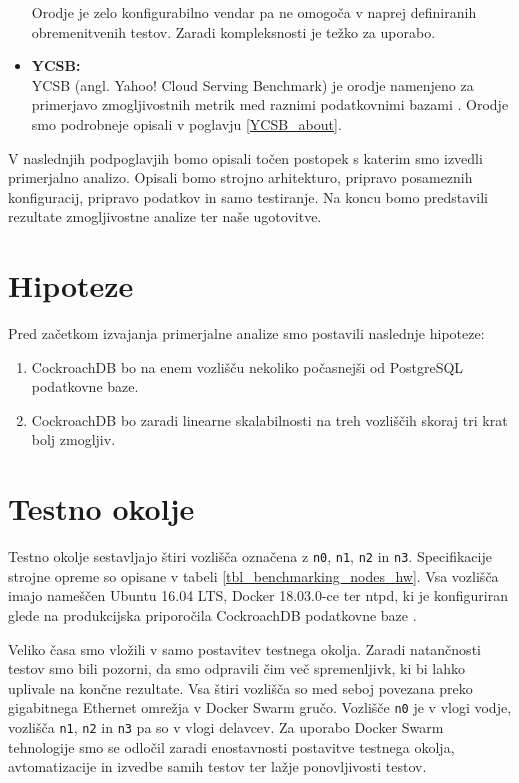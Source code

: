 \documentclass[a4paper, 12pt]{book}
\begin{document}
\begin{itemize}
    Orodje je zelo konfigurabilno vendar pa ne omogoča v naprej definiranih obremenitvenih testov. Zaradi kompleksnosti je težko za uporabo.
    \item \textbf{YCSB:}\\ YCSB (angl. Yahoo! Cloud Serving Benchmark) je orodje namenjeno za primerjavo zmogljivostnih metrik med raznimi podatkovnimi bazami \cite{brianfrankcooper/YCSB}. Orodje smo podrobneje opisali v poglavju \ref{YCSB_about}.
\end{itemize}

V naslednjih podpoglavjih bomo opisali točen postopek s katerim smo izvedli primerjalno analizo. Opisali bomo strojno arhitekturo, pripravo posameznih konfiguracij, pripravo podatkov in samo testiranje. Na koncu bomo predstavili rezultate zmogljivostne analize ter naše ugotovitve.

\section{Hipoteze}
Pred začetkom izvajanja primerjalne analize smo postavili naslednje hipoteze:
\begin{enumerate}
    \item CockroachDB bo na enem vozlišču nekoliko počasnejši od PostgreSQL podatkovne baze.

    \item CockroachDB bo zaradi linearne skalabilnosti na treh vozliščih skoraj tri krat bolj zmogljiv.
\end{enumerate}

\section{Testno okolje}
Testno okolje sestavljajo štiri vozlišča označena z \texttt{n0}, \texttt{n1}, \texttt{n2} in \texttt{n3}. Specifikacije strojne opreme so opisane v tabeli \ref{tbl_benchmarking_nodes_hw}. Vsa vozlišča imajo nameščen Ubuntu 16.04 LTS, Docker 18.03.0-ce ter ntpd, ki je konfiguriran glede na produkcijska priporočila  CockroachDB podatkovne baze \cite{CRDB-ntpd-configuration}.

Veliko časa smo vložili v samo postavitev testnega okolja. Zaradi natančnosti testov smo bili pozorni, da smo odpravili čim več spremenljivk, ki bi lahko uplivale na končne rezultate.
Vsa štiri vozlišča so med seboj povezana preko gigabitnega Ethernet omrežja v Docker Swarm \cite{Docker-Swarm-Mode} gručo. Vozlišče \texttt{n0} je v vlogi vodje, vozlišča \texttt{n1}, \texttt{n2} in \texttt{n3} pa so v vlogi delavcev. Za uporabo Docker Swarm tehnologije smo se odločil zaradi enostavnosti postavitve testnega okolja, avtomatizacije in izvedbe samih testov ter lažje ponovljivosti testov.
\end{document}

